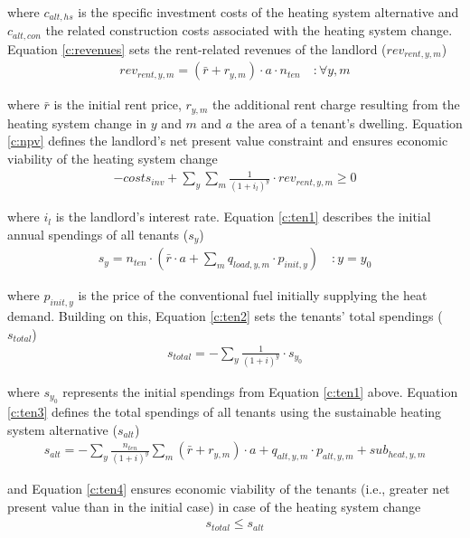 where $c_{alt,hs}$ is the specific investment costs of the heating system alternative and $c_{alt,con}$ the related construction costs associated with the heating system change. Equation \ref{c:revenues} sets the rent-related revenues of the landlord ($rev_{rent,y,m}$)
\begin{align}\label{c:revenues}
rev_{rent,y,m} = (\bar{r} + r_{y,m}) \cdot a \cdot n_{ten} \quad :\forall y,m
\end{align}

where $\bar{r}$ is the initial rent price, $r_{y,m}$ the additional rent charge resulting from the heating system change in $y$ and $m$ and $a$ the area of a tenant's dwelling. Equation \ref{c:npv} defines the landlord's net present value constraint and ensures economic viability of the heating system change
\begin{align}\label{c:npv}
-costs_{inv} + \sum_{y} \sum_{m} \frac{1}{(1+i_l)^y} \cdot rev_{rent,y,m} \geq 0
\end{align}

where $i_l$ is the landlord's interest rate. Equation \ref{c:ten1} describes the initial annual spendings of all tenants ($s_{y}$)
\begin{align}\label{c:ten1}
s_{y} = n_{ten} \cdot (\bar{r} \cdot a + \sum_{m} q_{load,y,m} \cdot p_{init,y}) \quad :y=y_0
\end{align}

where $p_{init,y}$ is the price of the conventional fuel initially supplying the heat demand. Building on this, Equation \ref{c:ten2} sets the tenants' total spendings ($s_{total}$)
\begin{align}\label{c:ten2}
s_{total} = -\sum_{y} \frac{1}{(1+i)^y} \cdot s_{y_0}
\end{align}

where $s_{y_0}$ represents the initial spendings from Equation \ref{c:ten1} above. Equation \ref{c:ten3} defines the total spendings of all tenants using the sustainable heating system alternative ($s_{alt}$)
\begin{align}\label{c:ten3}
	s_{alt} = -\sum_{y} \frac{n_{ten}}{(1+i)^y} \sum_{m}  (\bar{r} + r_{y,m})\cdot a + q_{alt,y,m} \cdot p_{alt,y,m}+sub_{heat,y,m}
\end{align}

and Equation \ref{c:ten4} ensures economic viability of the tenants (i.e., greater net present value than in the initial case) in case of the heating system change
\begin{align}\label{c:ten4}
s_{total} \leq s_{alt}
\end{align}

